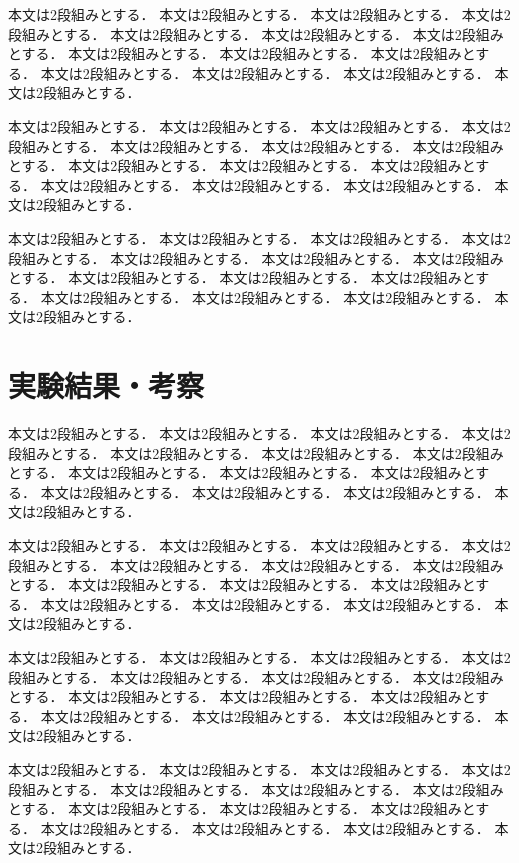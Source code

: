 \documentclass{/workdir/classes/summary}
\begin{document}
本文は2段組みとする．
本文は2段組みとする．
本文は2段組みとする．
本文は2段組みとする．
本文は2段組みとする．
本文は2段組みとする．
本文は2段組みとする．
本文は2段組みとする．
本文は2段組みとする．
本文は2段組みとする．
本文は2段組みとする．
本文は2段組みとする．
本文は2段組みとする．
本文は2段組みとする．

本文は2段組みとする．
本文は2段組みとする．
本文は2段組みとする．
本文は2段組みとする．
本文は2段組みとする．
本文は2段組みとする．
本文は2段組みとする．
本文は2段組みとする．
本文は2段組みとする．
本文は2段組みとする．
本文は2段組みとする．
本文は2段組みとする．
本文は2段組みとする．
本文は2段組みとする．

本文は2段組みとする．
本文は2段組みとする．
本文は2段組みとする．
本文は2段組みとする．
本文は2段組みとする．
本文は2段組みとする．
本文は2段組みとする．
本文は2段組みとする．
本文は2段組みとする．
本文は2段組みとする．
本文は2段組みとする．
本文は2段組みとする．
本文は2段組みとする．
本文は2段組みとする．

\section{実験結果・考察}
本文は2段組みとする．
本文は2段組みとする．
本文は2段組みとする．
本文は2段組みとする．
本文は2段組みとする．
本文は2段組みとする．
本文は2段組みとする．
本文は2段組みとする．
本文は2段組みとする．
本文は2段組みとする．
本文は2段組みとする．
本文は2段組みとする．
本文は2段組みとする．
本文は2段組みとする．

本文は2段組みとする．
本文は2段組みとする．
本文は2段組みとする．
本文は2段組みとする．
本文は2段組みとする．
本文は2段組みとする．
本文は2段組みとする．
本文は2段組みとする．
本文は2段組みとする．
本文は2段組みとする．
本文は2段組みとする．
本文は2段組みとする．
本文は2段組みとする．
本文は2段組みとする．

本文は2段組みとする．
本文は2段組みとする．
本文は2段組みとする．
本文は2段組みとする．
本文は2段組みとする．
本文は2段組みとする．
本文は2段組みとする．
本文は2段組みとする．
本文は2段組みとする．
本文は2段組みとする．
本文は2段組みとする．
本文は2段組みとする．
本文は2段組みとする．
本文は2段組みとする．

本文は2段組みとする．
本文は2段組みとする．
本文は2段組みとする．
本文は2段組みとする．
本文は2段組みとする．
本文は2段組みとする．
本文は2段組みとする．
本文は2段組みとする．
本文は2段組みとする．
本文は2段組みとする．
本文は2段組みとする．
本文は2段組みとする．
本文は2段組みとする．
本文は2段組みとする．
\end{document}
